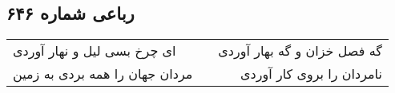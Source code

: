 \begin{center}
\section*{رباعی شماره ۶۴۶}
\label{sec:sh646}
\begin{longtable}{l p{0.5cm} r}
ای چرخ بسی لیل و نهار آوردی
&&
گه فصل خزان و گه بهار آوردی
\\
مردان جهان را همه بردی به زمین
&&
نامردان را بروی کار آوردی
\\
\end{longtable}
\end{center}
